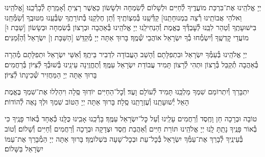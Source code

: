 \documentclass[twoside, openany, parskip=half, 11pt]{book}
\begin{document}
יְיָ אֱלֹהֵֽינוּ אֶת־בִּרְכַּת מוֹעֲדֶֽיךָ לְ֯חַיִּים וּלְשָׁלוֹם לְ֯שִׂמְחָה וּלְשָׂשׂוֹן כַּאֲשֶׁר רָצִֽיתָ וְ֯אָמַֽרְתָּ לְ֯בָרְ֯כֵֽנוּ׃ [\shabbos אֱלֹהֵֽינוּ וֵאלֹהֵי אֲבוֹתֵֽינוּ רְ֯צֵה בִמְנוּחָתֵֽנוּ] קַדְּ֯שֵֽׁנוּ בְּ֯מִצְוֹתֶֽיךָ וְ֯תֵן חֶלְקֵֽנוּ בְּ֯תוֹרָתֶֽךָ שַׂבְּ֯עֵֽנוּ מִטּוּבֶֽךָ וְ֯שַׂמְּ֯חֵֽנוּ בִּישׁוּעָתֶֽךָ וְ֯טַהֵר לִבֵּֽנוּ לְ֯עׇבְדְּ֯ךָ בֶּאֱמֶת וְ֯הַנְחִילֵֽנוּ יְיָ אֱלֹהֵֽינוּ בְּ֯אַהֲבָה וּבְרָצוֹן בְּ֯שִׂמְחָה וּבְשָׂשׂוֹן [\shabbos שַׁבַּת וּ] מוֹעֲדֵי קׇדְשֶֽׁךָ וְ֯יִשְׂמְ֯חוּ בְ֯ךָ יִשְׂרָאֵל אוֹהֲבֵי שְׁ֯מֶֽךָ׃ בָּרוּךְ אַתָּה יְיָ מְ֯קַדֵּשׁ
[\shabbos הַשַּׁבָּת וְ] יִשְׂרָאֵל וְ֯הַזְּ֯מַנִּים׃


יְיָ אֱלֹהֵֽינוּ בְּ֯עַמְּ֯ךָ יִשְׂרָאֵל וּבִתְפִלָּתָם וְ֯הָשֵׁב הָעֲבוֹדָה לִדְבִיר בֵּיתֶֽךָ׃ וְ֯אִשֵּׁי יִשְׂרָאֵל וּתְפִלָּתָם מְ֯הֵרָה בְּ֯אַהֲבָה תְ֯קַבֵּל בְּ֯רָצוֹן וּתְהִי לְ֯רָצוֹן תָּמִיד עֲבוֹדַת יִשְׂרָאֵל עַמֶּֽךָ׃ וְ֯תֶחֱזֶֽינָה עֵינֵֽינוּ בְּ֯שׁוּבְ֯ךָ לְ֯צִיּוֹן בְּ֯רַחֲמִים׃ בָּרוּךְ אַתָּה יְיָ הַמַּחֲזִיר שְׁ֯כִינָתוֹ לְ֯צִיּוֹן׃

\modim


\vspace{-\baselineskip}
יִתְבָּרַךְ וְ֯יִתְרוֹמַם שִׁמְךָ מַלְכֵּֽנוּ תָּמִיד לְ֯עוֹלָם וָעֶד׃ וְ֯כׇל־הַחַיִּים יוֹדֽוּךָ סֶּֽלָה וִיהַלְלוּ אֶת־שִׁמְךָ בֶּאֱמֶת הָאֵל יְ֯שׁוּעָתֵֽנוּ וְ֯עֶזְרָתֵֽנוּ סֶֽלָה׃ בָּרוּךְ אַתָּה יְיָ הַטּוֹב שִׁמְךָ וּלְךָ נָאֶה לְ֯הוֹדוֹת׃



טוֹבָה וּבְרָכָה חֵן וָחֶֽסֶד וְ֯רַחֲמִים עָלֵֽינוּ וְ֯עַל כׇּל־יִשְׂרָאֵל עַמֶּֽךָ׃ בָּרְ֯כֵֽנוּ אָבִֽינוּ כֻּלָּֽנוּ כְּ֯אֶחָד בְּ֯אוֹר פָּנֶֽיךָ כִּי בְ֯אוֹר פָּנֶֽיךָ נָתַֽתָּ לָֽנוּ יְיָ אֱלֹהֵֽינוּ תּוֹרַת חַיִּים וְ֯אַהֲבַת חֶֽסֶד וּצְדָקָה וּבְרָכָה וְ֯רַחֲמִים וְ֯חַיִּים וְ֯שָׁלוֹם׃ וְ֯טוֹב בְּ֯עֵינֶֽיךָ לְ֯בָרֵךְ אֶת־עַמְּ֯ךָ יִשְׂרָאֵל בְּ֯כׇל־עֵת וּבְכׇל־שָׁעָה בִּשְׁלוֹמֶֽךָ׃ בָּרוּךְ אַתָּה יְיָ הַמְ֯בָרֵךְ אֶת־עַמּוֹ יִשְׂרָאֵל בַּשָּׁלוֹם׃

\tachanunim

\vfill


\\

\sepline

\\
\\
\end{document}
